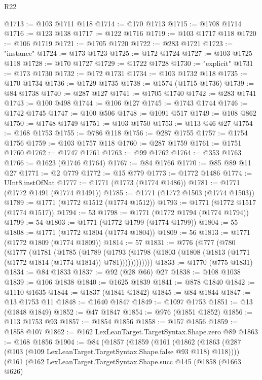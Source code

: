 \begin{lexlean}{R22}
\begin{coremodule}
@1713 := @103 @1711 @118
@1714 := @170 @1713
@1715 := @1708 @1714
@1716 := @123 @138
@1717 := @122 @1716
@1719 := @103 @1717 @118
@1720 := @106 @1719
@1721 := @1705 @1720
@1722 := @283 @1721
@1723 := "instance"
@1724 := @173 @1723
@1725 := @172 @1724
@1727 := @103 @1725 @118
@1728 := @170 @1727
@1729 := @1722 @1728
@1730 := "explicit"
@1731 := @173 @1730
@1732 := @172 @1731
@1734 := @103 @1732 @118
@1735 := @170 @1734
@1736 := @1729 @1735
@1738 := @1574 (@1715 @1736)
@1739 := @84 @1738
@1740 := @287 @127
@1741 := @1705 @1740
@1742 := @283 @1741
@1743 := @100 @498
@1744 := @106 @127
@1745 := @1743 @1744
@1746 := @1742 @1745
@1747 := @100 @506
@1748 := @1091 @517
@1749 := @108 @862
@1750 := @1748 @1749
@1751 := @103 @1750
@1753 := @113 @46 @27
@1754 := @168 @1753
@1755 := @786 @118
@1756 := @287 @1755
@1757 := @1754 @1756
@1759 := @103 @1757 @118
@1760 := @287 @1759
@1761 := @1751 @1760
@1762 := @1747 @1761
@1763 := @99 @1762
@1764 := @353 @1763
@1766 := @1623 (@1746 @1764)
@1767 := @84 @1766
@1770 := @85 @89 @11 @27
@1771 := @2 @779
@1772 := @15 @779
@1773 := @1772 @1486
@1774 := UInt8.instOfNat
@1777 := @1771 (@1773 (@1774 @1486))
@1781 := @1771 (@1772 @1491 (@1774 @1491))
@1785 := @1771 (@1772 @1503 (@1774 @1503))
@1789 := @1771 (@1772 @1512 (@1774 @1512))
@1793 := @1771 (@1772 @1517 (@1774 @1517))
@1794 := 53
@1798 := @1771 (@1772 @1794 (@1774 @1794))
@1799 := 54
@1803 := @1771 (@1772 @1799 (@1774 @1799))
@1804 := 55
@1808 := @1771 (@1772 @1804 (@1774 @1804))
@1809 := 56
@1813 := @1771 (@1772 @1809 (@1774 @1809))
@1814 := 57
@1831 := @776
    (@777
      (@780
        (@1777
          (@1781
            (@1785
              (@1789
                (@1793
                  (@1798 (@1803 (@1808 (@1813 (@1771 (@1772 @1814 (@1774 @1814)) @781))))))))))))
@1833 := @1770 (@775 @1831)
@1834 := @84 @1833
@1837 := @92 (@28 @66) @27
@1838 := @108 @1038
@1839 := @106 @1838
@1840 := @1625 @1839
@1841 := @878 @1840
@1842 := @1110 @1635
@1844 := @1837 (@1841 @1842)
@1845 := @84 @1844
@1847 := @13 @1753 @11
@1848 := @1640 @1847
@1849 := @1097 @1753
@1851 := @13 (@1848 @1849)
@1852 := @47 @1847
@1854 := @976 (@1851 @1852)
@1856 := @113 @1753 @93
@1857 := @1854 @1856
@1858 := @157 @1856
@1859 := @1858 @107
@1862 := @162 LexLeanTarget.TargetSyntax.Shape.zero @89
@1863 := @168 @1856
@1904 := @84
    (@1857
      (@1859
        (@161
          (@1862 (@1863 (@287 (@103 (@109 LexLeanTarget.TargetSyntax.Shape.false @93 @118) @118))))
          (@161
            (@162
              LexLeanTarget.TargetSyntax.Shape.succ
              @145
              (@1858
                (@1663 @626)

\end{coremodule}
\end{lexlean}
